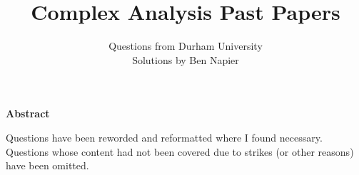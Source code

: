 \documentclass[a4paper, answers]{exam}
\title{Complex Analysis Past Papers}
\author{
    Questions from Durham University \\ 
    Solutions by Ben Napier
}
\begin{document}
    \begin{titlepage}
        \maketitle
    \end{titlepage}

    \tableofcontents
    \clearpage

    \thispagestyle{empty}
    \vspace*{21.5em}
    \begin{center}
        \parbox{0.77\textwidth}{
            \noindent
            \begin{center}
                \normalsize\textbf{Abstract}
            \end{center}
            \vspace{-3pt}
            Questions have been reworded and reformatted where
            I found necessary.
            Questions whose content had not been covered due
            to strikes (or other reasons) have been omitted.
        }
    \end{center}
    \vspace*{\fill}

    \clearpage
    \begin{questions}
        
    \end{questions}
\end{document}
